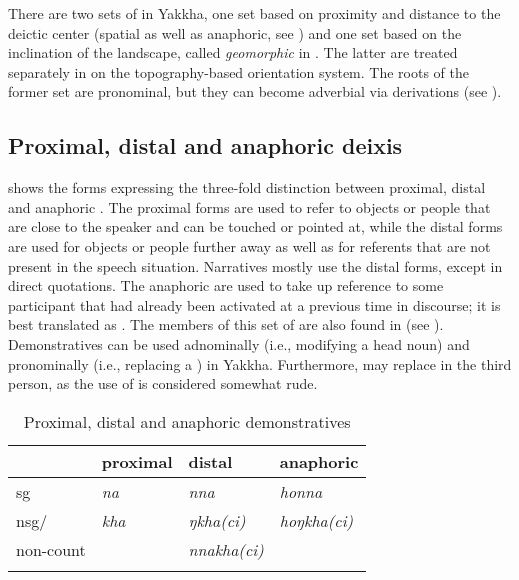 There are two sets of  in Yakkha, one set based on proximity and distance to the deictic center (spatial as well as anaphoric, see ) and one set based on the inclination of the landscape, called \emph{geomorphic} in \citet{Bickel1997Spatial}. The latter are treated separately in  on the topography-based orientation system. The roots of the former set are pronominal, but they can become adverbial via derivations (see ). 


\subsection{Proximal, distal and anaphoric deixis}\label{dem-pron-1}

 shows the forms expressing the three-fold distinction between proximal, distal and anaphoric . The proximal forms are used to refer to objects or people that are close to the speaker and can be touched or pointed at, while the distal forms are used for objects or people further away as well as for referents that are not present in the speech situation. Narratives mostly use the distal forms, except in direct quotations. The anaphoric  are used to take up  reference to some participant that had  already been activated at a previous time in discourse; it is best translated as  . The members of this set of  are also found in  (see ). Demonstratives can be used adnominally (i.e., modifying a head noun) and pronominally (i.e., replacing a ) in Yakkha. Furthermore,  may replace  in the third person, as the use of  is considered somewhat rude.


\begin{table}[htp]
\begin{centering}
\begin{tabular}{llll}
\lsptoprule
&			{\sc proximal} 	& {\sc distal}	& {\sc anaphoric}  \\
\midrule
{\sc sg}						&	\emph{na}		&	\emph{nna}		& \emph{honna}\\
{\sc nsg/}	&		\emph{kha}	&	\emph{ŋkha(ci)}	\ti	& \emph{hoŋkha(ci)}\\
{\sc non-count}	&			&	\emph{nnakha(ci)}	& \\
\lspbottomrule
\end{tabular}\\
\caption{Proximal, distal and anaphoric demonstratives}\label{dem-tab}
\end{centering}
\end{table}


